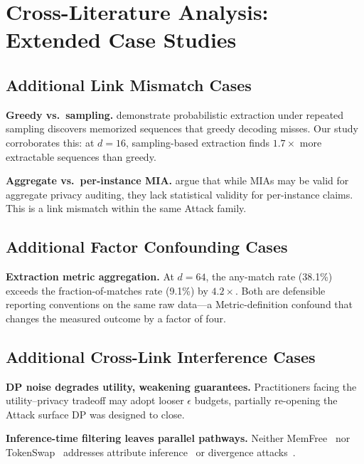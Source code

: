 \documentclass[11pt]{article}
\begin{document}
\section{Cross-Literature Analysis: Extended Case Studies}
\label{app:cross-literature}

\subsection{Additional Link Mismatch Cases}

\textbf{Greedy vs.\ sampling.}
\citet{hayes2025measuringmemorizationlanguagemodels} demonstrate probabilistic
extraction under repeated sampling discovers memorized sequences that greedy
decoding misses.
Our study corroborates this: at $d{=}16$, sampling-based extraction finds
$1.7\times$ more extractable sequences than greedy.

\textbf{Aggregate vs.\ per-instance MIA.}
\citet{zhang2025membershipinferenceattacksprove} argue that while MIAs may be
valid for aggregate privacy auditing, they lack statistical validity for
per-instance claims.
This is a link mismatch within the same Attack family.

\subsection{Additional Factor Confounding Cases}

\textbf{Extraction metric aggregation.}
At $d{=}64$, the any-match rate (38.1\%) exceeds the fraction-of-matches rate
(9.1\%) by $4.2\times$.
Both are defensible reporting conventions on the same raw data---a
Metric-definition confound that changes the measured outcome by a factor of
four.

\subsection{Additional Cross-Link Interference Cases}

\textbf{DP noise degrades utility, weakening guarantees.}
Practitioners facing the utility--privacy tradeoff may adopt looser $\epsilon$
budgets, partially re-opening the Attack surface DP was designed to close.

\textbf{Inference-time filtering leaves parallel pathways.}
Neither MemFree~\citep{ippolito-etal-2023-preventing} nor
TokenSwap~\citep{prashanttokenswap} addresses attribute
inference~\citep{staab2024memorizationviolatingprivacyinference} or divergence
attacks~\citep{nasr2023scalableextractiontrainingdata}.
\end{document}
